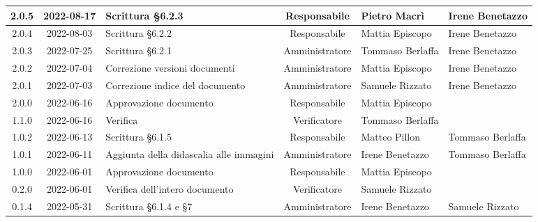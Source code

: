 \begin{center}
\begin{longtable}{ |c|c|p{8em}|c|m{5em}|m{5em}| }
	\hline
	2.0.5 & 2022-08-17 & Scrittura §6.2.3 & Responsabile & Pietro \newline Macrì & Irene \newline Benetazzo  \\	
	\hline
	2.0.4 & 2022-08-03 & Scrittura §6.2.2 & Responsabile & Mattia \newline Episcopo & Irene \newline Benetazzo  \\	
	\hline
	2.0.3 & 2022-07-25 & Scrittura §6.2.1 & Amministratore & Tommaso \newline Berlaffa & Irene \newline Benetazzo  \\
	\hline
	2.0.2 & 2022-07-04 & Correzione versioni documenti & Amministratore & Mattia \newline Episcopo & Irene \newline Benetazzo\\
	\hline
	2.0.1 & 2022-07-03 & Correzione indice del documento & Amministratore & Samuele \newline Rizzato & Irene \newline Benetazzo\\
	\hline
	2.0.0 & 2022-06-16 & Approvazione documento & Responsabile & Mattia \newline Episcopo & \\
	\hline 
	1.1.0 & 2022-06-16 & Verifica & Verificatore & Tommaso \newline Berlaffa & \\
	\hline 
  1.0.2 & 2022-06-13 & Scrittura §6.1.5 & Responsabile & Matteo \newline Pillon & Tommaso \newline Berlaffa\\
	\hline 
	1.0.1 & 2022-06-11 & Aggiunta della didascalia alle immagini & Amministratore & Irene \newline Benetazzo & Tommaso \newline Berlaffa\\
	\hline 
	1.0.0 & 2022-06-01 & Approvazione documento & Responsabile & Mattia \newline Episcopo & \\
	\hline 
	0.2.0 & 2022-06-01 & Verifica dell'intero documento & Verificatore & Samuele \newline Rizzato & \\
	\hline 
	0.1.4 & 2022-05-31 & Scrittura §6.1.4 e §7 & Amministratore & Irene \newline Benetazzo & Samuele \newline Rizzato\\

\end{longtable}
\end{center}
